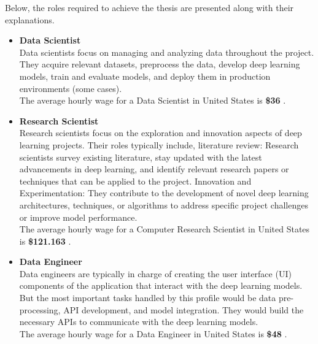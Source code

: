 Below, the roles required to achieve the thesis are presented along with their explanations. \\

\begin{itemize}
    \item \textbf{Data Scientist} \\

Data scientists focus on managing and analyzing data throughout the project. They acquire relevant datasets, preprocess the data, develop deep learning models, train and evaluate models, and deploy them in production environments (some cases). \\

The average hourly wage for a Data Scientist in United States is \textbf{\$36} \cite{SalaryDataScientist}. \\

\item \textbf{Research Scientist} \\

Research scientists focus on the exploration and innovation aspects of deep learning projects. Their roles typically include, literature review: Research scientists survey existing literature, stay updated with the latest advancements in deep learning, and identify relevant research papers or techniques that can be applied to the project. Innovation and Experimentation: They contribute to the development of novel deep learning architectures, techniques, or algorithms to address specific project challenges or improve model performance. \\

The average hourly wage for a Computer Research Scientist in United States is \textbf{\$121.163} \cite{SalaryResearchScientist}. \\

\item \textbf{Data Engineer} \\

Data engineers are typically in charge of creating the user interface (UI) components of the application that interact with the deep learning models. But the most important tasks handled by this profile would be data pre-processing, API development, and model integration. They would build the necessary APIs to communicate with the deep learning models. \\

The average hourly wage for a Data Engineer in United States is \textbf{\$48} \cite{SalaryDataEnginner}. \\

\end{itemize}

